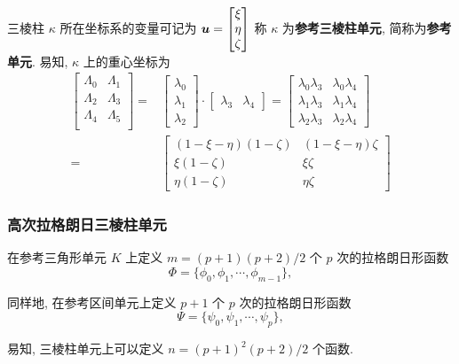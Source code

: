 \documentclass{beamer}
\numberwithin{subsection}{section}
\begin{document}
\begin{frame}
    三棱柱 $\kappa$ 所在坐标系的变量可记为 ${\boldsymbol u} = \begin{bmatrix} \xi \\ \eta
    \\ \zeta \end{bmatrix}$ 
    称 $\kappa$ 为{\bf 参考三棱柱单元}, 简称为{\bf 参考单元}.  易知, $\kappa$ 上的重心坐标为
    \begin{align*}
        \begin{bmatrix}
            \Lambda_0 & \Lambda_1\\
            \Lambda_2 & \Lambda_3\\
            \Lambda_4 & \Lambda_5\\
        \end{bmatrix}
        =&
        \begin{bmatrix}
            \lambda_0 \\ \lambda_1 \\ \lambda_2 
        \end{bmatrix}
        \cdot
        \begin{bmatrix}
            \lambda_3 & \lambda_4 
        \end{bmatrix}
        =
        \begin{bmatrix}
            \lambda_0 \lambda_3 & \lambda_0 \lambda_4 \\
            \lambda_1 \lambda_3 & \lambda_1 \lambda_4 \\
            \lambda_2 \lambda_3 & \lambda_2 \lambda_4
        \end{bmatrix}\\
        =&
        \begin{bmatrix}
            (1-\xi-\eta)(1-\zeta) & (1-\xi-\eta)\zeta \\
            \xi(1-\zeta) & \xi \zeta \\
            \eta(1-\zeta) & \eta\zeta
        \end{bmatrix}
    \end{align*}
\end{frame}

\begin{frame}
    \frametitle{高次拉格朗日三棱柱单元}
    在参考三角形单元 $K$ 上定义 $m=(p+1)(p+2)/2$ 个 $p$ 次的拉格朗日形函数
    $$
        \Phi = \{\phi_0, \phi_1, \cdots, \phi_{m-1}\},
    $$
    
    同样地, 在参考区间单元上定义 $p+1$ 个 $p$ 次的拉格朗日形函数
    $$
        \Psi = \{\psi_0, \psi_1, \cdots, \psi_p\},
    $$
    \begin{remark}
        易知, 三棱柱单元上可以定义 $n=(p+1)^2(p+2)/2$ 个函数.
    \end{remark}
\end{frame}
\end{document}
